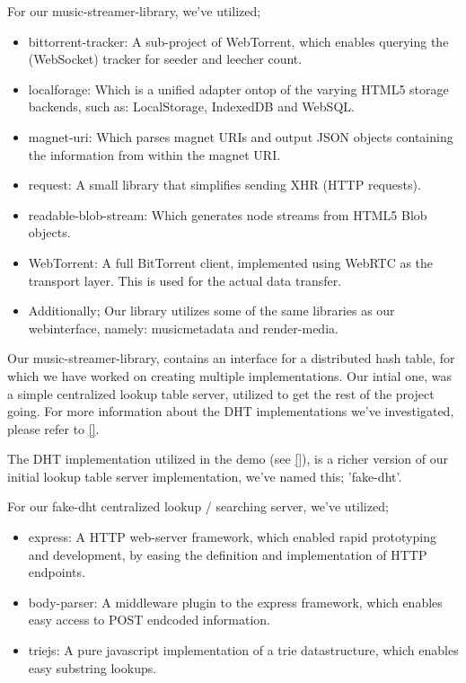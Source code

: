 For our music-streamer-library, we've utilized;
\begin{itemize}
\item bittorrent-tracker: A sub-project of WebTorrent, which enables querying 
        the (WebSocket) tracker for seeder and leecher count.
\item localforage: Which is a unified adapter ontop of the varying HTML5
        storage backends, such as: LocalStorage, IndexedDB and WebSQL.
\item magnet-uri: Which parses magnet URIs and output JSON objects containing
        the information from within the magnet URI.
\item request: A small library that simplifies sending XHR (HTTP requests).
\item readable-blob-stream: Which generates node streams from HTML5 Blob objects.
\item WebTorrent: A full BitTorrent client, implemented using WebRTC as the 
        transport layer. This is used for the actual data transfer.
\item Additionally; Our library utilizes some of the same libraries as our
        webinterface, namely: musicmetadata and render-media.
\end{itemize}

Our music-streamer-library, contains an interface for a distributed hash table,
for which we have worked on creating multiple implementations. Our intial one,
was a simple centralized lookup table server, utilized to get the rest of the 
project going. For more information about the DHT implementations we've 
investigated, please refer to \ref{}.

The DHT implementation utilized in the demo (see \ref{}), is a richer version
of our initial lookup table server implementation, we've named this; 'fake-dht'.

For our fake-dht centralized lookup / searching server, we've utilized;
\begin{itemize}
\item express: A HTTP web-server framework, which enabled rapid prototyping and
        development, by easing the definition and implementation of HTTP endpoints.
\item body-parser: A middleware plugin to the express framework, which enables 
        easy access to POST endcoded information.
\item triejs: A pure javascript implementation of a trie datastructure, which 
        enables easy substring lookups.
\end{itemize}

